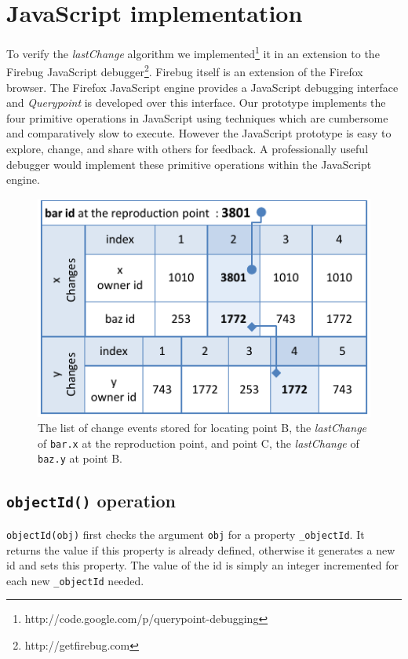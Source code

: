 \documentclass{sig-alternate}
\begin{document}
\section{JavaScript implementation}
To verify the \textit{lastChange} algorithm we
implemented\footnote[1]{http://code.google.com/p/querypoint-debugging} it in an extension to the Firebug
JavaScript debugger\footnote[2]{http://getfirebug.com}. %
Firebug itself is an extension of the Firefox browser. %
The Firefox JavaScript engine provides a JavaScript debugging interface \cite{JSD} and 
\textit{Querypoint} is developed over this interface. Our prototype implements the four primitive operations in JavaScript 
using techniques which are cumbersome and comparatively slow to execute. However the JavaScript prototype is
easy to explore, change, and share with others for feedback.
  A professionally useful debugger would implement these primitive operations within the JavaScript engine.

\begin{figure}[htp]
\centering 
\includegraphics[width=.48\textwidth]{8-lastchange-lastchange.pdf}
\caption{The list of change events stored for locating point B, the
  \textit{lastChange} of \texttt{bar.x} at the reproduction point, and
  point C, the \textit{lastChange} of \texttt{baz.y} at point B.}
\label{fig:lastchange-lastchange}
\end{figure}


\subsection{{\normalsize\bf\texttt{objectId()}} operation}
\texttt{objectId(obj)} first checks the argument \texttt{obj} for a property \texttt{\_objectId}.
It returns the value if this property is already defined,
otherwise it generates a new id and sets this property. The value of the id is simply an integer incremented 
for each new \texttt{\_objectId} needed. 
\end{document}
